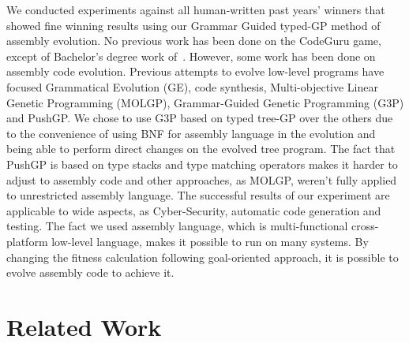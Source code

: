 \documentclass[dvipsnames,format=sigconf,anonymous=true,review=true]{acmart}
\begin{document}
We conducted experiments against all human-written past years' winners that showed fine winning results using our Grammar Guided typed-GP method of assembly evolution.
No previous work has been done on the CodeGuru game, except of Bachelor's degree work of~\cite{Darwin8086}. However, some work has been done on assembly code evolution. Previous attempts to evolve low-level programs have focused Grammatical Evolution (GE), code synthesis, Multi-objective Linear Genetic Programming (MOLGP), Grammar-Guided Genetic Programming (G3P) and PushGP. We chose to use G3P based on typed tree-GP over the others due to the convenience of using BNF for assembly language in the evolution and being able to perform direct changes on the evolved tree program. The fact that PushGP is based on type stacks and type matching operators makes it harder to adjust to assembly code and other approaches, as MOLGP, weren't fully applied to unrestricted assembly language.
The successful results of our experiment are applicable to wide aspects, as Cyber-Security, automatic code generation and testing. The fact we used assembly language, which is multi-functional cross-platform low-level language, makes it possible to run on many systems. By changing the fitness calculation following goal-oriented approach, it is possible to evolve assembly code to achieve it.  

\section{Related Work}
\end{document}
